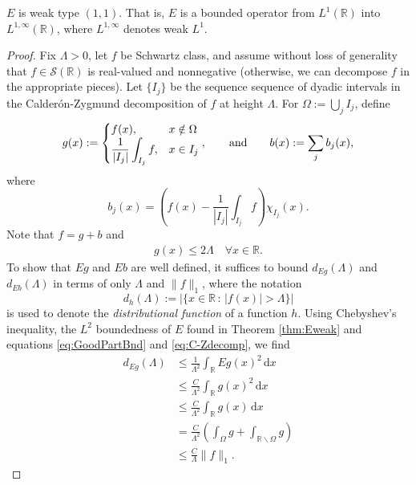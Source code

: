 \documentclass[../dissertation.tex]{subfiles}
\begin{document}
\begin{thm}\label{thm:Eweak}
	$E$ is weak type $(1, 1)$. That is, $E$ is a bounded operator from 
    $L^1(\mathbb R)$ into
    $L^{1, \infty}(\mathbb R)$, where  $L^{1, \infty}$ denotes weak $L^1$.
\end{thm}
\begin{proof}
    Fix $\Lambda > 0$, let $f$ be Schwartz class, and assume without loss of 
    generality that $f \in \mathscr S(\mathbb R)$ is real-valued and nonnegative 
    (otherwise, we can decompose $f$ in the appropriate pieces).
    Let $\{ I_j \}$ be the sequence sequence of dyadic intervals in the 
    Calder\'on-Zygmund decomposition of 
    $f$ at height $\Lambda$. For $\Omega := \bigcup_j I_j$, define 
    \begin{align}\label{eq:C-Zdecomp}
        g(x) :=  
            \begin{cases}
                \displaystyle f(x), & x \notin \Omega \\[0.5\baselineskip]
                \displaystyle \frac{1}{|I_j|} \int_{I_j} f, & x \in I_j
            \end{cases},
        \qquad \text{and} \qquad
        b(x) := \sum_j b_j(x),
    \end{align}
    where 
    \[
        b_j(x) = \left( f(x) - \dfrac{1}{|I_j|} \int_{I_j} f \right) \chi_{I_j}(x).
    \]
    Note that $f = g+b$ and
    \begin{align} \label{eq:GoodPartBnd}
        g(x) \leq 2 \Lambda \quad \forall x \in \mathbb R.
    \end{align}
    To show that $Eg$ and $Eb$ are well defined, it suffices
    to bound $d_{Eg}(\Lambda)$ and $d_{Eb}(\Lambda)$ in terms of only $\Lambda$ and 
    $\|f\|_1$, where
    the notation 
    \[
        d_h (\Lambda) := \big| \big\{ x \in \mathbb R \, : \, |f(x)| > \Lambda \big\} \big|
    \]
    is used to denote the \textit{distributional function} of a function $h$. Using
    Chebyshev's inequality, the $L^2$  boundedness of $E$ found in Theorem \ref{thm:Eweak}
    and equations \eqref{eq:GoodPartBnd} and \eqref{eq:C-Zdecomp}, we find
    \begin{align}\label{eq:dEgBound}
        d_{Eg}(\Lambda)
            &\leq \frac{1}{\Lambda^2} \int_{\mathbb R} E g(x)^2 \, \mathrm{d}x \\
            &\leq \frac{C}{\Lambda^2} \int_{\mathbb R} g(x)^2 \, \mathrm{d}x \nonumber\\
            &\leq \frac{C}{\Lambda^2} \int_{\mathbb R} g(x) \, \mathrm{d}x \nonumber\\
            &= \frac{C}{\Lambda^2} \left( \int_{\Omega} g 
                + \int_{\mathbb{R} \backslash \Omega} g  \right) \nonumber\\
            &\leq \frac{C}{\Lambda} \| f \|_1.  \nonumber
    \end{align}



\end{proof}
\end{document}
